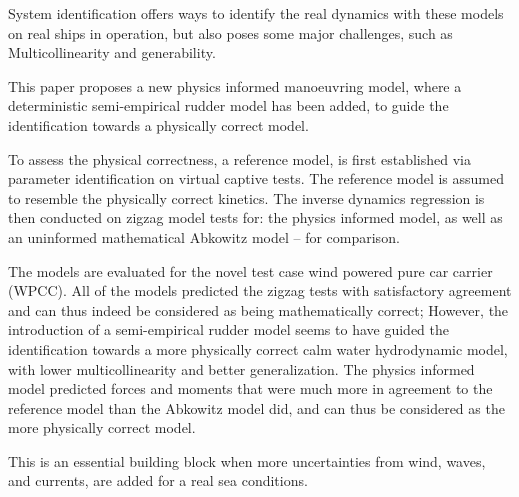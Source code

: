 
System identification offers ways to identify the real dynamics with these models on real ships in operation, but also poses some major challenges, such as Multicollinearity and generability. 

This paper proposes a new physics informed manoeuvring model, where a deterministic semi-empirical rudder model has been added, to guide the identification towards a physically correct model. 

To assess the physical correctness, a reference model, is first established via parameter identification on virtual captive tests. The reference model is assumed to resemble the physically correct kinetics.  
The inverse dynamics regression is then conducted on zigzag model tests for: the physics informed model, as well as an uninformed mathematical Abkowitz model -- for comparison. 

The models are evaluated for the novel test case wind powered pure car carrier (WPCC).
All of the models predicted the zigzag tests with satisfactory agreement and can thus indeed be considered as being mathematically correct; However, the introduction of a semi-empirical rudder model seems to have guided the identification towards a more physically correct calm water hydrodynamic model, with lower multicollinearity and better generalization. The physics informed model predicted forces and moments that were much more in agreement to the reference model than the Abkowitz model did, and can thus be considered as the more physically correct model. 

 This is an essential building block when more uncertainties from wind, waves, and currents, are added for a real sea conditions.